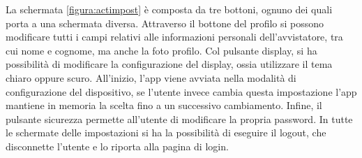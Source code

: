 \documentclass[a4paper,final,12pt]{report}
\begin{document}
La schermata \ref{figura:actimpost} è composta da tre bottoni, ognuno dei quali porta a una schermata diversa. Attraverso il bottone del profilo si possono modificare tutti i campi relativi alle informazioni personali dell'avvistatore, tra cui nome e cognome, ma anche la foto profilo. Col pulsante display, si ha possibilità di modificare la configurazione del display, ossia utilizzare il tema chiaro oppure scuro. All'inizio, l'app viene avviata nella modalità di configurazione del dispositivo, se l'utente invece cambia questa impostazione l'app mantiene in memoria la scelta fino a un successivo cambiamento. Infine, il pulsante sicurezza permette all'utente di modificare la propria password. In tutte le schermate delle impostazioni si ha la possibilità di eseguire il logout, che disconnette l'utente e lo riporta alla pagina di login.
\end{document}
